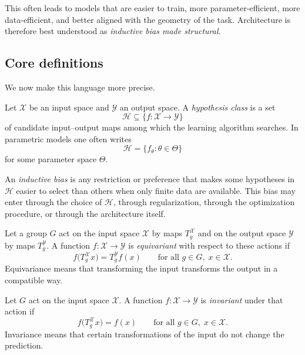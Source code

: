 \medskip

This often leads to models that are easier to train, more parameter-efficient, more data-efficient, and better aligned with the geometry of the task.
Architecture is therefore best understood as \emph{inductive bias made structural}.

\subsection*{Core definitions}

We now make this language more precise.

\begin{definition}
Let $\mathcal{X}$ be an input space and $\mathcal{Y}$ an output space.
A \emph{hypothesis class} is a set
\[
\mathcal{H} \subseteq \{f : \mathcal{X} \to \mathcal{Y}\}
\]
of candidate input--output maps among which the learning algorithm searches.
In parametric models one often writes
\[
\mathcal{H} = \{f_{\theta} : \theta \in \Theta\}
\]
for some parameter space $\Theta$.
\end{definition}

\begin{definition}
An \emph{inductive bias} is any restriction or preference that makes some hypotheses in $\mathcal{H}$ easier to select than others when only finite data are available.
This bias may enter through the choice of $\mathcal{H}$, through regularization, through the optimization procedure, or through the architecture itself.
\end{definition}

\begin{definition}[Equivariance]
Let a group $G$ act on the input space $\mathcal{X}$ by maps $T_g^{\mathcal{X}}$ and on the output space $\mathcal{Y}$ by maps $T_g^{\mathcal{Y}}$.
A function $f : \mathcal{X} \to \mathcal{Y}$ is \emph{equivariant} with respect to these actions if
\[
 f\bigl(T_g^{\mathcal{X}} x\bigr) = T_g^{\mathcal{Y}} f(x)
 \qquad \text{for all } g \in G,\; x \in \mathcal{X}.
\]
Equivariance means that transforming the input transforms the output in a compatible way.
\end{definition}

\begin{definition}[Invariance]
Let $G$ act on the input space $\mathcal{X}$.
A function $f : \mathcal{X} \to \mathcal{Y}$ is \emph{invariant} under that action if
\[
 f\bigl(T_g^{\mathcal{X}} x\bigr) = f(x)
 \qquad \text{for all } g \in G,\; x \in \mathcal{X}.
\]
Invariance means that certain transformations of the input do not change the prediction.
\end{definition}

